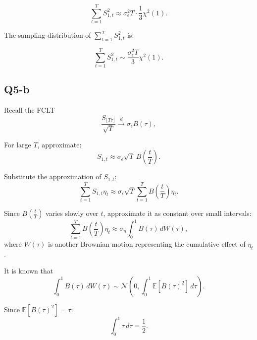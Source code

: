 \documentclass{article} %
\begin{document}
\begin{equation}
   \sum_{t=1}^{T} S_{1,t}^2 \approx \sigma_{\epsilon}^2 T \cdot \frac{1}{3} \chi^2(1).
\end{equation}

The sampling distribution of \( \sum_{t=1}^{T} S_{1,t}^2 \) is:

\begin{equation}
\sum_{t=1}^{T} S_{1,t}^2 \sim \frac{\sigma_{\epsilon}^2 T}{3} \chi^2(1).
\end{equation}


\subsection{Q5-b}

Recall the FCLT 
\begin{equation}
 \frac{S_{\lfloor T \tau \rfloor}}{\sqrt{T}} \overset{d}{\longrightarrow} \sigma_{\epsilon} B(\tau),
\end{equation}

For large \( T \), approximate:
\begin{equation}
   S_{1,t} \approx \sigma_{\epsilon} \sqrt{T}\, B\left(\frac{t}{T}\right).
\end{equation}

Substitute the approximation of \( S_{1,t} \):
\begin{equation}
 \sum_{t=1}^{T} S_{1,t} \eta_t \approx \sigma_{\epsilon} \sqrt{T} \sum_{t=1}^{T} B\left(\frac{t}{T}\right) \eta_t.
\end{equation}

Since \( B\left(\frac{t}{T}\right) \) varies slowly over \( t \), approximate it as constant over small intervals:
\begin{equation}
 \sum_{t=1}^{T} B\left(\frac{t}{T}\right) \eta_t \approx \sigma_{\eta} \int_{0}^{1} B(\tau) \, dW(\tau),
\end{equation}
where \( W(\tau) \) is another Brownian motion representing the cumulative effect of \( \eta_t \).

It is known that
\begin{equation}
   \int_{0}^{1} B(\tau) \, dW(\tau) \sim \mathcal{N}\left( 0, \int_{0}^{1} \mathbb{E}[B(\tau)^2] \, d\tau \right).
\end{equation}

Since \( \mathbb{E}[B(\tau)^2] = \tau \):
\begin{equation}
 \int_{0}^{1} \tau \, d\tau = \frac{1}{2}.
\end{equation}
\end{document}
